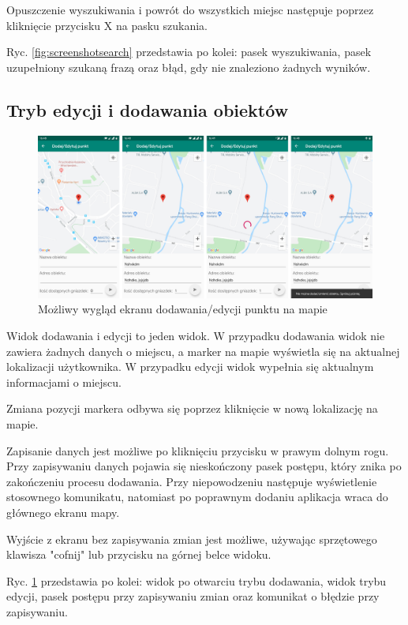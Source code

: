 \documentclass[polish,polish,a4paper,12pt]{article}
\begin{document}
	Opuszczenie wyszukiwania i powrót do wszystkich miejsc następuje poprzez kliknięcie przycisku X na pasku szukania.

	Ryc. \ref{fig:screenshotsearch} przedstawia po kolei: pasek wyszukiwania, pasek uzupełniony szukaną frazą oraz błąd, gdy nie znaleziono żadnych wyników.

	\subsection{Tryb edycji i dodawania obiektów}

	\begin{figure}[H]
		\centering
		\includegraphics[width = \textwidth]{screenshot-addedit}
		\caption{Możliwy wygląd ekranu dodawania/edycji punktu na mapie}
		\label{fig:screenshotaddedit}
	\end{figure}

	Widok dodawania i edycji to jeden widok. W przypadku dodawania widok nie zawiera żadnych danych o miejscu, a marker na mapie wyświetla się na aktualnej lokalizacji użytkownika. W przypadku edycji widok wypełnia się aktualnym informacjami o miejscu.

	Zmiana pozycji markera odbywa się poprzez kliknięcie w nową lokalizację na mapie.

	Zapisanie danych jest możliwe po kliknięciu przycisku w prawym dolnym rogu. Przy zapisywaniu danych pojawia się nieskończony pasek postępu, który znika po zakończeniu procesu dodawania. Przy niepowodzeniu następuje wyświetlenie stosownego komunikatu, natomiast po poprawnym dodaniu aplikacja wraca do głównego ekranu mapy.

	Wyjście z ekranu bez zapisywania zmian jest możliwe, używając sprzętowego klawisza "cofnij" lub przycisku na górnej belce widoku.

	Ryc. \ref{fig:screenshotaddedit} przedstawia po kolei: widok po otwarciu trybu dodawania, widok trybu edycji, pasek postępu przy zapisywaniu zmian oraz komunikat o błędzie przy zapisywaniu.
\end{document}
